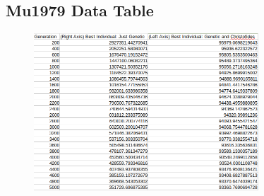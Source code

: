 \documentclass[11pt,a4paper,titlepage]{article}
\begin{document}
\begin{appendices}
\subsection{Mu1979 Data Table}

\begin{figure}[ht]
	\includegraphics[width=0.75\textwidth]{mu1979Table}
	\centering
\end{figure}
\end{appendices}
\end{document}
